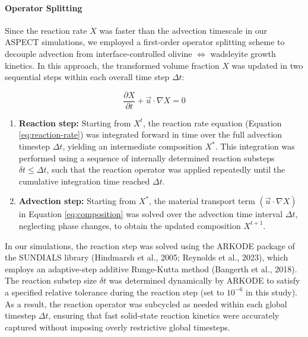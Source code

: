 \documentclass[draft,linenumbers]{agujournal2019}
\providecommand{\tightlist}{\setlength{\itemsep}{0pt}\setlength{\parskip}{0pt}}
\begin{document}
\paragraph{Operator Splitting}\label{sec:operator-splitting}

Since the reaction rate \(\dot{X}\) was faster than the advection
timescale in our ASPECT simulations, we employed a first-order operator
splitting scheme to decouple advection from interface-controlled olivine
\(\Leftrightarrow\) wadsleyite growth kinetics. In this approach, the
transformed volume fraction \(X\) was updated in two sequential steps
within each overall time step \(\Delta t\):

\begin{equation}
  \frac{\partial X}{\partial t} + \vec{u} \cdot \nabla X = 0
  \label{eq:composition}
\end{equation}

\begin{enumerate}
\def\labelenumi{\arabic{enumi}.}
\tightlist
\item
  \textbf{Reaction step:} Starting from \(X^{t}\), the reaction rate
  equation (Equation \ref{eq:reaction-rate}) was integrated forward in
  time over the full advection timestep \(\Delta t\), yielding an
  intermediate composition \(X^{\ast}\). This integration was performed
  using a sequence of internally determined reaction substeps
  \(\delta t \le \Delta t\), such that the reaction operator was applied
  repeatedly until the cumulative integration time reached \(\Delta t\).
\item
  \textbf{Advection step:} Starting from \(X^{\ast}\), the material
  transport term \(\left(\vec{u} \cdot \nabla X \right)\) in Equation
  \ref{eq:composition} was solved over the advection time interval
  \(\Delta t\), neglecting phase changes, to obtain the updated
  composition \(X^{t+1}\).
\end{enumerate}

In our simulations, the reaction step was solved using the ARKODE
package of the SUNDIALS library (Hindmarsh et al., 2005; Reynolds et
al., 2023), which employs an adaptive-step additive Runge-Kutta method
(Bangerth et al., 2018). The reaction substep size \(\delta t\) was
determined dynamically by ARKODE to satisfy a specified relative
tolerance during the reaction step (set to \(10^{-6}\) in this study).
As a result, the reaction operator was subcycled as needed within each
global timestep \(\Delta t\), ensuring that fast solid-state reaction
kinetics were accurately captured without imposing overly restrictive
global timesteps.
\end{document}
